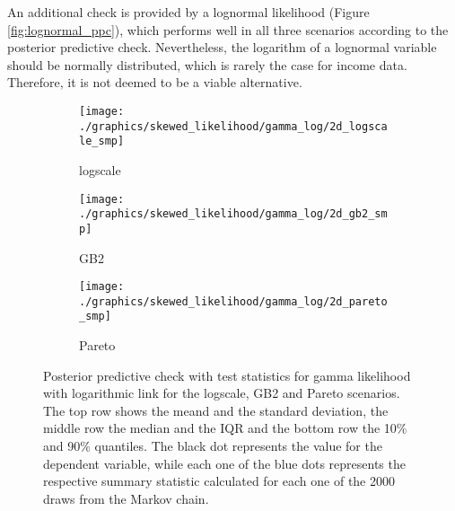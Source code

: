 An additional check is provided by a lognormal likelihood (Figure \ref{fig:lognormal_ppc}), which performs well in all three scenarios according to the posterior predictive check.
Nevertheless, the logarithm of a lognormal variable should be normally distributed, which is rarely the case for income data.
Therefore, it is not deemed to be a viable alternative.
\begin{figure}[t]
    \centering
    \begin{subfigure}{0.32\textwidth}
        \texttt{[image: ./graphics/skewed\_likelihood/gamma\_log/2d\_logscale\_smp]}
        \caption{logscale}
    \end{subfigure}
    \begin{subfigure}{0.32\textwidth}
        \texttt{[image: ./graphics/skewed\_likelihood/gamma\_log/2d\_gb2\_smp]}
        \caption{GB2}
    \end{subfigure}
    \begin{subfigure}{0.32\textwidth}
        \texttt{[image: ./graphics/skewed\_likelihood/gamma\_log/2d\_pareto\_smp]}
        \caption{Pareto}
    \end{subfigure}
    \label{fig:gamma_2d}
    \caption[Posterior predictive check with test statistics for gamma likelihood]{Posterior predictive check with test statistics for gamma likelihood with logarithmic link for the logscale, GB2 and Pareto scenarios. The top row shows the meand and the standard deviation, the middle row the median and the IQR and the bottom row the 10\% and 90\% quantiles. The black dot represents the value for the dependent variable, while each one of the blue dots represents the respective summary statistic calculated for each one of the 2000 draws from the Markov chain.}
\end{figure}

